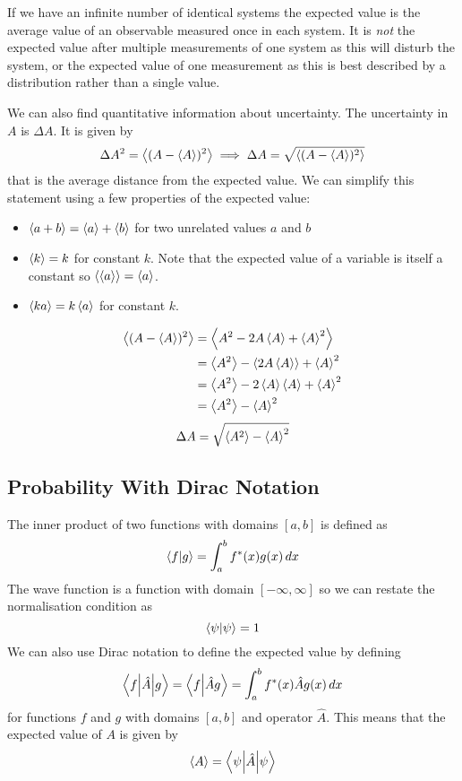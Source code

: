 \documentclass{article}
\newcommand{\braopket}[3]{\left\langle{#1}\middle|{#2}\middle|{#3}\right\rangle}
\begin{document}
    If we have an infinite number of identical systems the expected value is the average value of an observable measured once in each system.
    It is \emph{not} the expected value after multiple measurements of one system as this will disturb the system, or the expected value of one measurement as this is best described by a distribution rather than a single value.
    
    We can also find quantitative information about uncertainty.
    The uncertainty in \(A\) is \(\Delta A\).
    It is given by
    \[\Delta A^2 = \left\langle{(A - \left\langle{A}\right\rangle)^2}\right\rangle \implies \Delta A = \sqrt{\left\langle{(A - \left\langle{A}\right\rangle)^2}\right\rangle}\]
    that is the average distance from the expected value.
    We can simplify this statement using a few properties of the expected value:
    \begin{itemize}
        \item \(\left\langle{a + b}\right\rangle = \left\langle{a}\right\rangle + \left\langle{b}\right\rangle\) for two unrelated values \(a\) and \(b\)
        \item \(\left\langle{k}\right\rangle = k\) for constant \(k\). Note that the expected value of a variable is itself a constant so \(\left\langle{\left\langle{a}\right\rangle}\right\rangle = \left\langle{a}\right\rangle\).
        \item \(\left\langle{ka}\right\rangle = k\left\langle{a}\right\rangle\) for constant \(k\).
    \end{itemize}
    \begin{align*}
        \left\langle{(A - \left\langle{A}\right\rangle)^2}\right\rangle &= \left\langle{A^2 - 2A\left\langle{A}\right\rangle + \left\langle{A}\right\rangle^2}\right\rangle\\
        &= \left\langle{A^2}\right\rangle - \left\langle{2A\left\langle{A}\right\rangle}\right\rangle + \left\langle{A}\right\rangle^2\\
        &= \left\langle{A^2}\right\rangle - 2\left\langle{A}\right\rangle\left\langle{A}\right\rangle + \left\langle{A}\right\rangle^2\\
        &= \left\langle{A^2}\right\rangle - \left\langle{A}\right\rangle^2
    \end{align*}
    \[\Delta A = \sqrt{\left\langle{A^2}\right\rangle - \left\langle{A}\right\rangle^2}\]
    
    \subsection{Probability With Dirac Notation}
    The inner product of two functions with domains \([a, b]\) is defined as
    \[\braket{f}{g} = \int_a^bf^*(x)g(x)\,dx\]
    The wave function is a function with domain \([-\infty, \infty]\) so we can restate the normalisation condition as
    \[\braket{\psi}{\psi} = 1\]
    We can also use Dirac notation to define the expected value by defining
    \[\braopket{f}{\hat A}{g} = \braket{f}{\hat Ag} = \int_a^bf^*(x)\hat Ag(x)\,dx\]
    for functions \(f\) and \(g\) with domains \([a, b]\) and operator \(\hat A\).
    This means that the expected value of \(A\) is given by
    \[\expected{A} = \braopket{\psi}{\hat A}{\psi}\]
    
\end{document}
